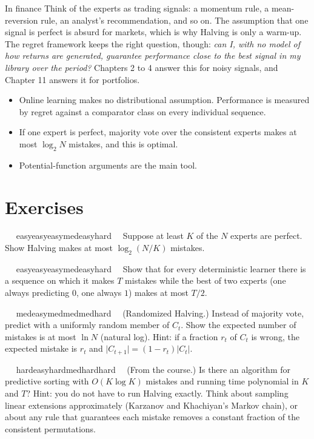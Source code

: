 \documentclass[11pt,a4paper,openany]{book}
\newcommand{\abs}[1]{\lvert #1\rvert}
\newcommand{\extag}[2]{%
  \def\tmp{#1}\def\tmpE{easy}\def\tmpM{med}\def\tmpH{hard}%
  \ifx\tmp\tmpE\def\tagc{defc}\else\ifx\tmp\tmpM\def\tagc{thmc}\else\ifx\tmp\tmpH\def\tagc{warnc}\else\def\tagc{finc}\fi\fi\fi
  \tcbox[on line,boxrule=0pt,arc=2pt,colback=\tagc!12,left=2pt,right=2pt,top=0pt,bottom=0pt,boxsep=1pt]{\sffamily\scriptsize\bfseries\color{\tagc}#2}}
\newcommand{\exercise}[3]{\par\medskip\noindent\textbf{\sffamily #1}\ \ #2\ \ #3\par}
\begin{document}
\begin{bfin}{In finance}
Think of the experts as trading signals: a momentum rule, a mean-reversion rule, an analyst's recommendation, and so on. The assumption that one signal is perfect is absurd for markets, which is why Halving is only a warm-up. The regret framework keeps the right question, though: \emph{can I, with no model of how returns are generated, guarantee performance close to the best signal in my library over the period?} Chapters 2 to 4 answer this for noisy signals, and Chapter 11 answers it for portfolios.
\end{bfin}

\begin{takeaways}
\begin{itemize}
\item Online learning makes no distributional assumption. Performance is measured by regret against a comparator class on every individual sequence.
\item If one expert is perfect, majority vote over the consistent experts makes at most $\log_2N$ mistakes, and this is optimal.
\item Potential-function arguments are the main tool.
\end{itemize}
\end{takeaways}

\section*{Exercises}\label{ch1-ex}

\exercise{1.1}{\extag{easy}{warm-up}}{\hypertarget{sol-1.1}{}Suppose at least $K$ of the $N$ experts are perfect. Show Halving makes at most $\log_2(N/K)$ mistakes.}

\exercise{1.2}{\extag{easy}{warm-up}}{\hypertarget{sol-1.2}{}Show that for every deterministic learner there is a sequence on which it makes $T$ mistakes while the best of two experts (one always predicting $0$, one always $1$) makes at most $T/2$.}

\exercise{1.3}{\extag{med}{core}}{\hypertarget{sol-1.3}{}(Randomized Halving.) Instead of majority vote, predict with a uniformly random member of $C_t$. Show the expected number of mistakes is at most $\ln N$ (natural log). Hint: if a fraction $r_t$ of $C_t$ is wrong, the expected mistake is $r_t$ and $\abs{C_{t+1}}=(1-r_t)\abs{C_t}$.}

\exercise{1.4}{\extag{hard}{challenge}}{\hypertarget{sol-1.4}{}(From the course.) Is there an algorithm for predictive sorting with $O(K\log K)$ mistakes and running time polynomial in $K$ and $T$? Hint: you do not have to run Halving exactly. Think about sampling linear extensions approximately (Karzanov and Khachiyan's Markov chain), or about any rule that guarantees each mistake removes a constant fraction of the consistent permutations.}
\end{document}
